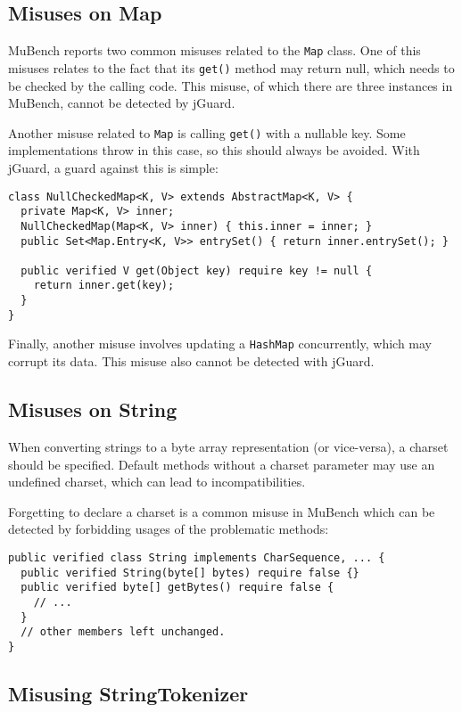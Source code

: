 \documentclass{article}
\begin{document}
\subsection{Misuses on Map}

MuBench reports two common misuses related to the \texttt{Map} class.
One of this misuses relates to the fact that its \texttt{get()} method may return
null, which needs to be checked by the calling code.
This misuse, of which there are three instances in MuBench, cannot be detected
by jGuard.

Another misuse related to \texttt{Map} is calling \texttt{get()} with a nullable
key. Some implementations throw in this case, so this should always be avoided.
With jGuard, a guard against this is simple:

\begin{lstlisting}[style=jGuard]
class NullCheckedMap<K, V> extends AbstractMap<K, V> {
  private Map<K, V> inner;
  NullCheckedMap(Map<K, V> inner) { this.inner = inner; }
  public Set<Map.Entry<K, V>> entrySet() { return inner.entrySet(); }

  public verified V get(Object key) require key != null {
    return inner.get(key);
  }
}
\end{lstlisting}

Finally, another misuse involves updating a \texttt{HashMap} concurrently,
which may corrupt its data.
This misuse also cannot be detected with jGuard.

\subsection{Misuses on String}

When converting strings to a byte array representation (or vice-versa), a charset should
be specified.
Default methods without a charset parameter may use an undefined charset, which can lead
to incompatibilities.

Forgetting to declare a charset is a common misuse in MuBench which can be detected by
forbidding usages of the problematic methods:

\begin{lstlisting}[style=jGuard]
public verified class String implements CharSequence, ... {
  public verified String(byte[] bytes) require false {}
  public verified byte[] getBytes() require false {
    // ...
  }
  // other members left unchanged.
}
\end{lstlisting}

\subsection{Misusing StringTokenizer}
\end{document}
